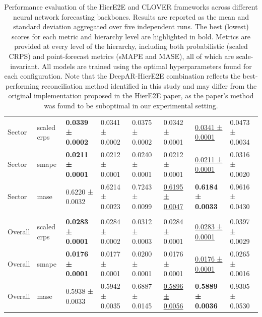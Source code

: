 \documentclass[letterpaper]{article}
\begin{document}
\begin{table}[h]
{{\begin{tabular}{llllllll}
Sector & scaled crps & \textbf{0.0339 ± 0.0002} & 0.0341 ± 0.0002 & 0.0375 ± 0.0002 & 0.0342 ± 0.0001 & \underline{0.0341 ± 0.0001} & 0.0473 ± 0.0034 \\
Sector & smape & \textbf{0.0211 ± 0.0001} & 0.0212 ± 0.0001 & 0.0240 ± 0.0001 & 0.0212 ± 0.0001 & \underline{0.0211 ± 0.0001} & 0.0316 ± 0.0020 \\
Sector & mase & 0.6220 ± 0.0032 & 0.6214 ± 0.0023 & 0.7243 ± 0.0099 & \underline{0.6195 ± 0.0047} & \textbf{0.6184 ± 0.0033} & 0.9616 ± 0.0430 \vspace{0.2em}\\
\hline \vspace{-0.9em} \\
Overall & scaled crps & \textbf{0.0283 ± 0.0001} & 0.0284 ± 0.0002 & 0.0312 ± 0.0003 & 0.0284 ± 0.0001 & \underline{0.0283 ± 0.0001} & 0.0397 ± 0.0029 \\
Overall & smape & \textbf{0.0176 ± 0.0001} & 0.0177 ± 0.0001 & 0.0200 ± 0.0001 & 0.0176 ± 0.0001 & \underline{0.0176 ± 0.0001} & 0.0265 ± 0.0016 \\
Overall & mase & 0.5938 ± 0.0033 & 0.5942 ± 0.0035 & 0.6887 ± 0.0145 & \underline{0.5896 ± 0.0056} & \textbf{0.5889 ± 0.0036} & 0.9305 ± 0.0530 \\
\bottomrule
\end{tabular}    
    }}
    \caption{
        Performance evaluation of the HierE2E and CLOVER frameworks across different neural network forecasting backbones. Results are reported as the mean and standard deviation aggregated over five independent runs. The best (lowest) scores for each metric and hierarchy level are highlighted in bold. Metrics are provided at every level of the hierarchy, including both probabilistic (scaled CRPS) and point-forecast metrics (sMAPE and MASE), all of which are scale-invariant. All models are trained using the optimal hyperparameters found for each configuration. Note that the DeepAR-HierE2E combination reflects the best-performing reconciliation method identified in this study and may differ from the original implementation proposed in the HierE2E paper, as the paper's method was found to be suboptimal in our experimental setting.
        }
    \label{tab:backbones}
\end{table}
\end{document}
